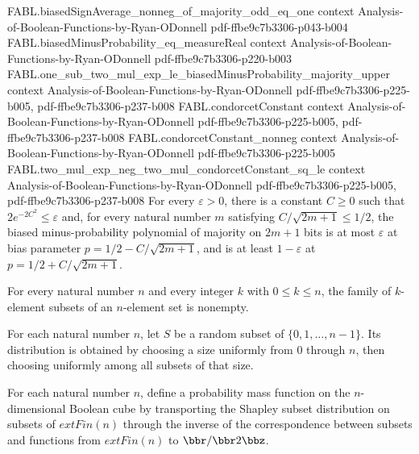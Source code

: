 \begin{theorem}
\proofstep
  {FABL.biasedSignAverage_nonneg_of_majority_odd_eq_one}
  {context}
  {Analysis-of-Boolean-Functions-by-Ryan-ODonnell}
  {pdf-ffbe9c7b3306-p043-b004}
\proofstep
  {FABL.biasedMinusProbability_eq_measureReal}
  {context}
  {Analysis-of-Boolean-Functions-by-Ryan-ODonnell}
  {pdf-ffbe9c7b3306-p220-b003}
\proofstep
  {FABL.one_sub_two_mul_exp_le_biasedMinusProbability_majority_upper}
  {context}
  {Analysis-of-Boolean-Functions-by-Ryan-ODonnell}
  {pdf-ffbe9c7b3306-p225-b005,
    pdf-ffbe9c7b3306-p237-b008}
\proofstep
  {FABL.condorcetConstant}
  {context}
  {Analysis-of-Boolean-Functions-by-Ryan-ODonnell}
  {pdf-ffbe9c7b3306-p225-b005,
    pdf-ffbe9c7b3306-p237-b008}
\proofstep
  {FABL.condorcetConstant_nonneg}
  {context}
  {Analysis-of-Boolean-Functions-by-Ryan-ODonnell}
  {pdf-ffbe9c7b3306-p225-b005}
\proofstep
  {FABL.two_mul_exp_neg_two_mul_condorcetConstant_sq_le}
  {context}
  {Analysis-of-Boolean-Functions-by-Ryan-ODonnell}
  {pdf-ffbe9c7b3306-p225-b005,
    pdf-ffbe9c7b3306-p237-b008}
For every $\varepsilon>0$, there is a constant $C\ge0$ such that
$2e^{-2C^2}\le\varepsilon$ and, for every natural number $m$ satisfying
$C/\sqrt{2m+1}\le1/2$, the biased minus-probability polynomial of majority on $2m+1$
bits is at most $\varepsilon$ at bias parameter $p=1/2-C/\sqrt{2m+1}$, and is at least
$1-\varepsilon$ at $p=1/2+C/\sqrt{2m+1}$.
\end{theorem}

\begin{theorem}
\label{FABL.powersetCard_univ_nonempty}
\leanok
{}
For every natural number $n$ and every integer $k$ with $0\le k\le n$, the family of
$k$-element subsets of an $n$-element set is nonempty.
\end{theorem}

\begin{definition}
\label{FABL.shapleySubsetPMF}
\leanok
{}
For each natural number $n$, let $S$ be a random subset of $\{0,1,\ldots,n-1\}$. Its
distribution is obtained by choosing a size uniformly from $0$ through $n$, then
choosing uniformly among all subsets of that size.
\end{definition}

\begin{definition}
\leanok
{}
For each natural number $n$, define a probability mass function on the $n$-dimensional
Boolean cube by transporting the Shapley subset distribution on subsets of
$	ext{Fin}(n)$ through the inverse of the correspondence between subsets and functions
from $	ext{Fin}(n)$ to $\bbr/\bbr 2\bbz$.
\end{definition}

